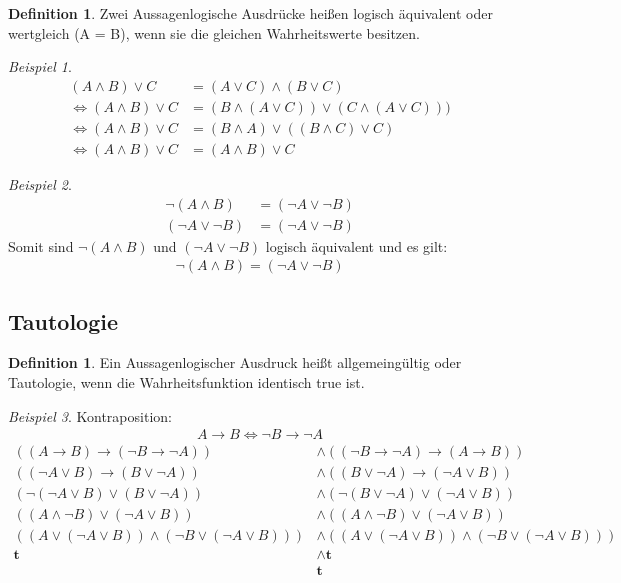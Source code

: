 \documentclass[12pt,a4paper,titlepage]{article} %
\theoremstyle{definition}
\newtheorem{defi}[satz]{Definition}
\theoremstyle{remark}
\newtheorem*{bsp}{Beispiel}
\begin{document}
	\begin{defi}
		Zwei Aussagenlogische Ausdrücke heißen logisch äquivalent oder wertgleich (A = B), wenn sie die gleichen Wahrheitswerte besitzen.
	\end{defi}
	\begin{bsp}
		\begin{align*}
			(A \wedge B) \vee C &= (A \vee C) \wedge (B \vee C)\\
			\Leftrightarrow (A \wedge B) \vee C &= (B \wedge (A \vee C)) \vee (C \wedge (A \vee C)))\\
			\Leftrightarrow (A \wedge B) \vee C &=  (B \wedge A) \vee ((B \wedge C) \vee C)\\
	 		\Leftrightarrow (A \wedge B) \vee C &= (A \wedge B) \vee C
		\end{align*}		
	\end{bsp}
	\begin{bsp}
		\begin{align*}
			\neg(A \wedge B) &= (\neg A \vee \neg B)\\
			(\neg A \vee \neg B) &= (\neg A \vee \neg B)
		\end{align*}
		Somit sind \(\neg(A \wedge B)\) und \((\neg A \vee \neg B)\) logisch äquivalent und es gilt:
		\begin{align*}
			\neg(A \wedge B) = (\neg A \vee \neg B)
		\end{align*}
	\end{bsp}
	\subsection{Tautologie}
	\begin{defi}
		Ein Aussagenlogischer Ausdruck heißt allgemeingültig oder Tautologie, wenn die Wahrheitsfunktion identisch true ist.
	\end{defi}	
	\begin{bsp}
		Kontraposition:\\
		\begin{align*}
			A \rightarrow B \Leftrightarrow \neg B \rightarrow \neg A
		\end{align*}
		\begin{align*}
			((A \rightarrow B) \rightarrow (\neg B \rightarrow \neg A)) &\wedge ((\neg B \rightarrow \neg A) \rightarrow (A \rightarrow B))\\
			((\neg A \vee B) \rightarrow (B \vee \neg A)) &\wedge ((B \vee \neg A) \rightarrow (\neg A \vee B))\\
			(\neg (\neg A \vee B) \vee (B \vee \neg A)) &\wedge (\neg (B \vee \neg A) \vee (\neg A \vee B))\\
			((A \wedge \neg B) \vee (\neg A \vee B)) &\wedge ((A \wedge \neg B) \vee (\neg A \vee B))\\
			((A \vee (\neg A \vee B)) \wedge (\neg B \vee (\neg A \vee B))) &\wedge ((A \vee (\neg A \vee B)) \wedge (\neg B \vee (\neg A \vee B)))\\
			\textbf{t} &\wedge \textbf{t}\\
			&\textbf{t}
		\end{align*}
	\end{bsp}
\end{document}
